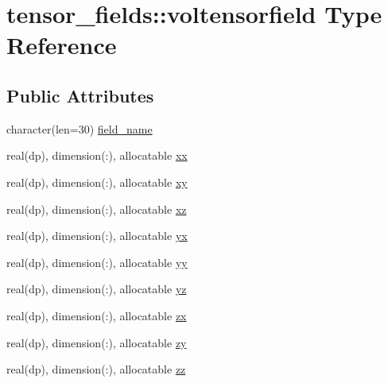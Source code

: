 \hypertarget{structtensor__fields_1_1voltensorfield}{\section{tensor\-\_\-fields\-:\-:voltensorfield Type Reference}
\label{structtensor__fields_1_1voltensorfield}
}
\subsection*{Public Attributes}
\begin{DoxyCompactItemize}
\item 
character(len=30) \hyperlink{structtensor__fields_1_1voltensorfield_a5c38fb87b18b6ab313c6f23323d1ec94}{field\-\_\-name}
\item 
real(dp), dimension(\-:), allocatable \hyperlink{structtensor__fields_1_1voltensorfield_a8221674d6d78a29bc3ccd870f588c74c}{xx}
\item 
real(dp), dimension(\-:), allocatable \hyperlink{structtensor__fields_1_1voltensorfield_af4b9355ff0748641d56386b83ea82fbe}{xy}
\item 
real(dp), dimension(\-:), allocatable \hyperlink{structtensor__fields_1_1voltensorfield_a32b3cd65e4759d11907c7db6085188f8}{xz}
\item 
real(dp), dimension(\-:), allocatable \hyperlink{structtensor__fields_1_1voltensorfield_a970dcfe8ae0976c548a30478f828f43c}{yx}
\item 
real(dp), dimension(\-:), allocatable \hyperlink{structtensor__fields_1_1voltensorfield_a73544475bca8705766227445ca6c0107}{yy}
\item 
real(dp), dimension(\-:), allocatable \hyperlink{structtensor__fields_1_1voltensorfield_a3787518ece64aa21a81687f43ddbffec}{yz}
\item 
real(dp), dimension(\-:), allocatable \hyperlink{structtensor__fields_1_1voltensorfield_a34ae7feea6ccf4787c9c42440a944065}{zx}
\item 
real(dp), dimension(\-:), allocatable \hyperlink{structtensor__fields_1_1voltensorfield_aa9d546da9f8c2e6f54f2e9cc77e83bd0}{zy}
\item 
real(dp), dimension(\-:), allocatable \hyperlink{structtensor__fields_1_1voltensorfield_ad1d7d9d3dd93ed15348d66332f35ab00}{zz}
\end{DoxyCompactItemize}



